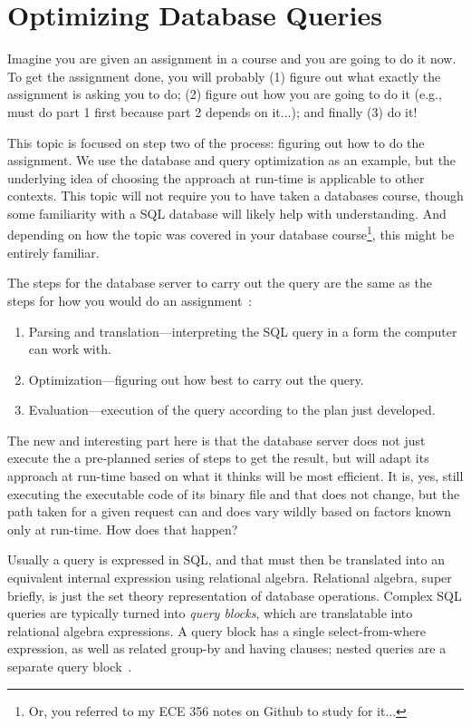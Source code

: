 




\section*{Optimizing Database Queries}

Imagine you are given an assignment in a course and you are going to do it now. To get the assignment done, you will probably (1) figure out what exactly the assignment is asking you to do; (2) figure out how you are going to do it (e.g., must do part 1 first because part 2 depends on it...); and finally (3) do it! 

This topic is focused on step two of the process: figuring out how to do the assignment. We use the database and query optimization as an example, but the underlying idea of choosing the approach at run-time is applicable to other contexts. This topic will not require you to have taken a databases course, though some familiarity with a SQL database will likely help with understanding. And depending on how the topic was covered in your database course\footnote{Or, you referred to my ECE 356 notes on Github to study for it...}, this might be entirely familiar.

The steps for the database server to carry out the query are the same as the steps for how you would do an assignment~\cite{dsc}:

\begin{enumerate}
	\item Parsing and translation---interpreting the SQL query in a form the computer can work with.
	\item Optimization---figuring out how best to carry out the query.
	\item Evaluation---execution of the query according to the plan just developed.
\end{enumerate}

The new and interesting part here is that the database server does not just execute the a pre-planned series of steps to get the result, but will adapt its approach at run-time based on what it thinks will be most efficient. It is, yes, still executing the executable code of its binary file and that does not change, but the path taken for a given request can and does vary wildly based on factors known only at run-time. How does that happen?

Usually a query is expressed in SQL, and that must then be translated into an equivalent internal expression using relational algebra. Relational algebra, super briefly, is just the set theory representation of database operations. Complex SQL queries are typically turned into \textit{query blocks}, which are translatable into relational algebra expressions. A query block has a single select-from-where expression, as well as related group-by and having clauses; nested queries are a separate query block~\cite{fds}.

